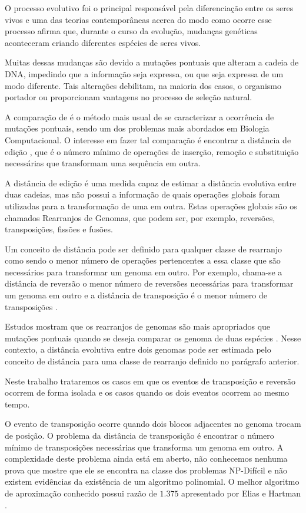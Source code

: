 O processo evolutivo foi o principal responsável pela diferenciação
entre os seres vivos e uma das teorias contemporâneas acerca do modo
como ocorre esse processo afirma que, durante o curso da evolução,
mudanças genéticas aconteceram criando diferentes espécies de
seres vivos.

Muitas dessas mudanças são devido a mutações pontuais que alteram a
cadeia de DNA, impedindo que a informação seja expressa, ou que seja
expressa de um modo diferente. Tais alterações debilitam, na maioria
dos casos, o organismo portador ou proporcionam vantagens no processo
de seleção natural.

A comparação de \seq{} é o método mais usual de se caracterizar a
ocorrência de mutações pontuais, sendo um dos problemas mais abordados
em Biologia Computacional. O interesse em fazer tal comparação é
encontrar a distância de edição \cite{SetubalMeidanis*1997}, que é o
número mínimo de operações de inserção, remoção e substituição
necessárias que transformam uma sequência em outra.

A distância de edição é uma medida capaz de estimar a distância
evolutiva entre duas cadeias, mas não possui a informação de quais
operações globais foram utilizadas para a transformação de uma
\seq{} em outra. Estas operações globais são os chamados
Rearranjos de Genomas, que podem ser, por exemplo, reversões,
transposições, fissões e fusões.

Um conceito de distância pode ser definido para qualquer classe de
rearranjo como sendo o menor número de operações pertencentes a essa
classe que são necessários para transformar um genoma em outro. Por
exemplo, chama-se a distância de reversão o menor número de reversões
necessárias para transformar um genoma em outro
\cite{BafnaPevzner*1996} e a distância de transposição é o menor
número de transposições \cite{BafnaPevzner*1998}.

Estudos mostram que os rearranjos de genomas são mais apropriados que
mutações pontuais quando se deseja comparar os genoma de duas espécies
\cite{PalmerHerbon*1988}. Nesse contexto, a distância evolutiva entre
dois genomas pode ser estimada pelo conceito de distância para uma
classe de rearranjo definido no parágrafo anterior.

Neste trabalho trataremos os casos em que os eventos de transposição e
reversão ocorrem de forma isolada e os casos quando os dois eventos
ocorrem ao mesmo tempo.

O evento de transposição ocorre quando dois blocos adjacentes no
genoma trocam de posição. O problema da distância de transposição é
encontrar o número mínimo de transposições necessárias que transforma
um genoma em outro. A complexidade deste problema ainda está em
aberto, não conhecemos nenhuma prova que mostre que ele se encontra na
classe dos problemas NP-Difícil e não existem evidências da existência
de um algoritmo polinomial. O melhor algoritmo de aproximação
conhecido possui razão de $1.375$ apresentado por Elias e
Hartman \cite{EliasHartman*2006}.

